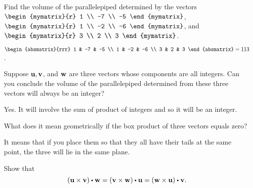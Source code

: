 \begin{enumialphparenastyle}

\begin{ex}
  Find the volume of the parallelepiped determined by the vectors
  $\begin{mymatrix}{r}
    1 \\
    -7 \\
    -5
  \end{mymatrix} $, \\
  $\begin{mymatrix}{r}
    1 \\
    -2 \\
    -6
  \end{mymatrix}$, and $\begin{mymatrix}{r}
    3 \\
    2 \\
    3
  \end{mymatrix}$.
  \begin{sol}
    $\begin{absmatrix}{rrr}
      1 & -7 & -5 \\
      1 & -2 & -6 \\
      3 & 2 & 3
    \end{absmatrix}= 113$.
  \end{sol}
\end{ex}

\begin{ex}
  Suppose $\mbox{\bf u},\mbox{\bf v}$, and $\mbox{\bf w}$ are three vectors whose
  components are all integers. Can you conclude the volume of the
  parallelepiped determined from these three vectors will always be an
  integer?
  \begin{sol}
    Yes. It will involve the sum of product of integers and so it will
    be an integer.
  \end{sol}
\end{ex}

\begin{ex} \label{exer-box-product-zero}
  What does it mean geometrically if the box product of three vectors
  equals zero?
  \begin{sol}
    It means that if you place them so that they all have their tails
    at the same point, the three will lie in the same plane.
  \end{sol}
\end{ex}

\begin{ex}
  Show that
  \begin{equation*}
    \tup{\vect{u}\times \vect{v}} \dotprod \vect{w}=
    \tup{\vect{v}\times \vect{w}} \dotprod \vect{u}=
    \tup{\vect{w}\times \vect{u}} \dotprod \vect{v}.
  \end{equation*}
\end{ex}


\end{enumialphparenastyle}
